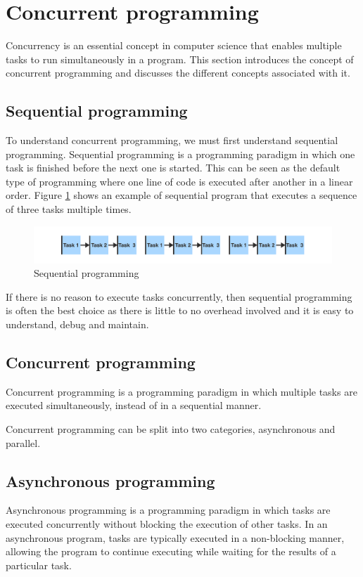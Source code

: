 \section{Concurrent programming}
Concurrency is an essential concept in computer science that enables multiple tasks to run simultaneously in a program.
This section introduces the concept of concurrent programming and discusses the different concepts associated with it.


\subsection{Sequential programming}
To understand concurrent programming, we must first understand sequential programming.
Sequential programming is a programming paradigm in which one task is finished before the next one is started.
This can be seen as the default type of programming where one line of code is executed after another in a linear order.
Figure \ref{fig:concurrency_sequential} shows an example of sequential program that executes a sequence of three tasks multiple times.

\begin{figure}[H]
    \centering
    \includegraphics[width=\textwidth]{figures/concurrency/sequential.pdf}
    \caption{Sequential programming}
    \label{fig:concurrency_sequential}
\end{figure}

If there is no reason to execute tasks concurrently, then sequential programming is often the best choice as there is little to no overhead involved and it is easy to understand, debug and maintain.

\subsection{Concurrent programming}
Concurrent programming is a programming paradigm in which multiple tasks are executed simultaneously, instead of in a sequential manner.


Concurrent programming can be split into two categories, asynchronous and parallel.


\subsection{Asynchronous programming}
Asynchronous programming is a programming paradigm in which tasks are executed concurrently without blocking the execution of other tasks.
In an asynchronous program, tasks are typically executed in a non-blocking manner, allowing the program to continue executing while waiting for the results of a particular task.

